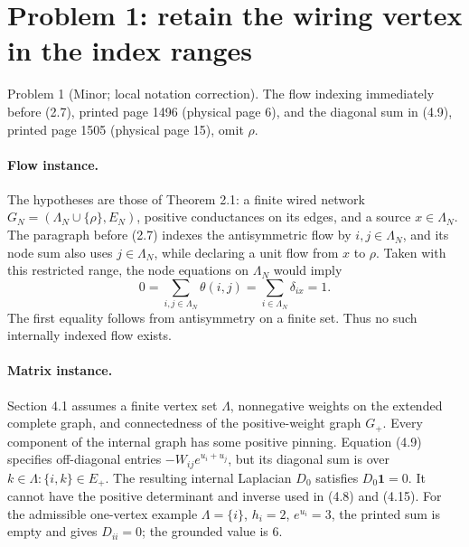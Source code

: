 \documentclass[10pt]{article}
\begin{document}
\section*{Problem 1: retain the wiring vertex in the index ranges}
Problem 1 (Minor; local notation correction).  The flow indexing immediately before (2.7), printed page 1496 (physical page 6), and the diagonal sum in (4.9), printed page 1505 (physical page 15), omit \(\rho\).\par
\paragraph*{Flow instance.}\mbox{}\par
The hypotheses are those of Theorem 2.1: a finite wired network \(G_N=(\Lambda_N\cup\{\rho\},E_N)\), positive conductances on its edges, and a source \(x\in\Lambda_N\). The paragraph before (2.7) indexes the antisymmetric flow by \(i,j\in\Lambda_N\), and its node sum also uses \(j\in\Lambda_N\), while declaring a unit flow from \(x\) to \(\rho\). Taken with this restricted range, the node equations on \(\Lambda_N\) would imply \[0=\sum_{i,j\in\Lambda_N}\theta(i,j)
   =\sum_{i\in\Lambda_N}\delta_{ix}=1.\] The first equality follows from antisymmetry on a finite set. Thus no such internally indexed flow exists.\par
\paragraph*{Matrix instance.}\mbox{}\par
Section 4.1 assumes a finite vertex set \(\Lambda\), nonnegative weights on the extended complete graph, and connectedness of the positive-weight graph \(G_+\). Every component of the internal graph has some positive pinning. Equation (4.9) specifies off-diagonal entries \(-W_{ij}e^{u_i+u_j}\), but its diagonal sum is over \(k\in\Lambda:\{i,k\}\in E_+\). The resulting internal Laplacian \(D_0\) satisfies \(D_0\mathbf1=0\). It cannot have the positive determinant and inverse used in (4.8) and (4.15). For the admissible one-vertex example \(\Lambda=\{i\}\), \(h_i=2\), \(e^{u_i}=3\), the printed sum is empty and gives \(D_{ii}=0\); the grounded value is \(6\).\par
\end{document}
